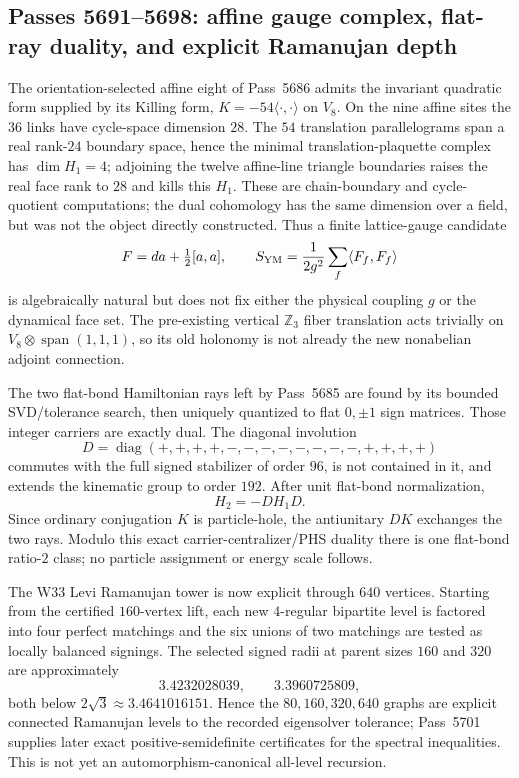 \subsection*{Passes 5691--5698: affine gauge complex, flat-ray duality, and explicit Ramanujan depth}

The orientation-selected affine eight of Pass~5686 admits the invariant quadratic
form supplied by its Killing form, $K=-54\langle\cdot,\cdot\rangle$ on $V_8$.
On the nine affine sites the $36$ links have cycle-space dimension $28$.  The $54$
translation parallelograms span a real rank-$24$ boundary space, hence the minimal
translation-plaquette complex has $\dim H_1=4$; adjoining the twelve affine-line
triangle boundaries raises the real face rank to $28$ and kills this $H_1$.
These are chain-boundary and cycle-quotient computations; the dual cohomology has
the same dimension over a field, but was not the object directly constructed.
Thus a finite lattice-gauge candidate
\[
 F=da+\tfrac12[a,a],\qquad
 S_{\rm YM}=\frac{1}{2g^2}\sum_f\langle F_f,F_f\rangle
\]
is algebraically natural but does not fix either the physical coupling $g$ or the
dynamical face set.  The pre-existing vertical $\mathbb Z_3$ fiber translation acts
trivially on $V_8\otimes\operatorname{span}(1,1,1)$, so its old holonomy is not
already the new nonabelian adjoint connection.

The two flat-bond Hamiltonian rays left by Pass~5685 are found by its bounded
SVD/tolerance search, then uniquely quantized to flat $0,\pm1$ sign matrices.
Those integer carriers are exactly dual.  The diagonal
involution
\[
 D=\operatorname{diag}(+,+,+,+,-,-,-,-,-,-,-,-,+,+,+,+)
\]
commutes with the full signed stabilizer of order $96$, is not contained in it, and
extends the kinematic group to order $192$.  After unit flat-bond normalization,
\[
 H_2=-D H_1D.
\]
Since ordinary conjugation $K$ is particle-hole, the antiunitary $DK$ exchanges the
two rays.  Modulo this exact carrier-centralizer/PHS duality there is one flat-bond
ratio-$2$ class; no particle assignment or energy scale follows.

The W33 Levi Ramanujan tower is now explicit through $640$ vertices.  Starting from
the certified $160$-vertex lift, each new $4$-regular bipartite level is factored
into four perfect matchings and the six unions of two matchings are tested as
locally balanced signings.  The selected signed radii at parent sizes $160$ and
$320$ are approximately
\[
 3.4232028039,\qquad 3.3960725809,
\]
both below $2\sqrt3\approx3.4641016151$.  Hence the $80,160,320,640$ graphs are
explicit connected Ramanujan levels to the recorded eigensolver tolerance;
Pass~5701 supplies later exact positive-semidefinite certificates for the spectral
inequalities.  This is not yet an automorphism-canonical all-level recursion.

